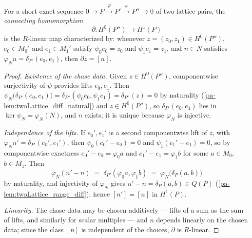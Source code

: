 \begin{definition}
  \label{pa-def:twoLattice_delta}
  \leanok

  For a short exact sequence \(0 \to P \xrightarrow{\varphi} P' \xrightarrow{\psi}
  P'' \to 0\) of two-lattice pairs, the \emph{connecting homomorphism}
  \[
    \partial : H^0(P'') \longrightarrow H^1(P)
  \]
  is the \(R\)-linear map characterized by: whenever \(z = (z_0, z_1) \in H^0(P'')\),
  \(e_0 \in M_0'\) and \(e_1 \in M_1'\) satisfy \(\psi_0 e_0 = z_0\) and
  \(\psi_1 e_1 = z_1\), and \(n \in N\) satisfies
  \(\varphi_N n = \delta_{P'}(e_0, e_1)\), then \(\partial z = [n]\).
\end{definition}
\begin{proof}
  \leanok
  \emph{Existence of the chase data.} Given \(z \in H^0(P'')\), componentwise
  surjectivity of \(\psi\) provides lifts \(e_0, e_1\). Then
  \(\psi_N\bigl(\delta_{P'}(e_0,e_1)\bigr) = \delta_{P''}(\psi_0 e_0, \psi_1 e_1)
  = \delta_{P''}(z) = 0\) by naturality (\ref{pa-lem:twoLattice_diff_natural}) and
  \(z \in H^0(P'')\), so \(\delta_{P'}(e_0,e_1)\) lies in \(\ker \psi_N =
  \varphi_N(N)\), and \(n\) exists; it is unique because \(\varphi_N\) is injective.

  \emph{Independence of the lifts.} If \(e_0', e_1'\) is a second componentwise lift of
  \(z\), with \(\varphi_N n' = \delta_{P'}(e_0', e_1')\), then
  \(\psi_0(e_0' - e_0) = 0\) and \(\psi_1(e_1' - e_1) = 0\), so by componentwise
  exactness \(e_0' - e_0 = \varphi_0 a\) and \(e_1' - e_1 = \varphi_1 b\) for some
  \(a \in M_0\), \(b \in M_1\). Then
  \[
    \varphi_N(n' - n) \;=\; \delta_{P'}(\varphi_0 a, \varphi_1 b)
    \;=\; \varphi_N\bigl(\delta_P(a, b)\bigr)
  \]
  by naturality, and injectivity of \(\varphi_N\) gives
  \(n' - n = \delta_P(a,b) \in Q(P)\) (\ref{pa-lem:twoLattice_range_diff}); hence
  \([n'] = [n]\) in \(H^1(P)\).

  \emph{Linearity.} The chase data may be chosen additively --- lifts of a sum as the
  sum of lifts, and similarly for scalar multiples --- and \(n\) depends linearly on
  the chosen data; since the class \([n]\) is independent of the choices, \(\partial\)
  is \(R\)-linear.
\end{proof}


